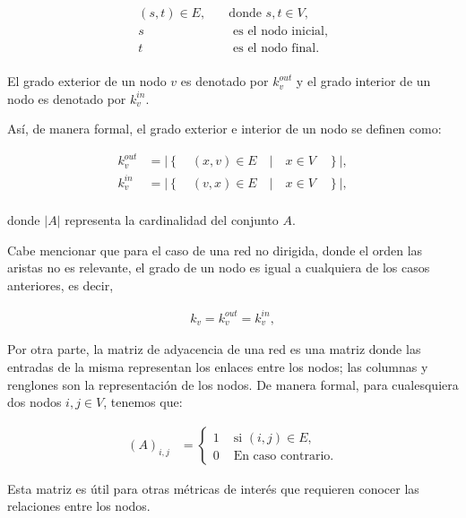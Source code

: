 \documentclass[../main.tex]{subfiles}
\begin{document}

\begin{align*}
    (s,t) \in E, &\quad \text{donde } s,t \in V, \\
    s &\quad \text{ es el nodo inicial,} \\
    t &\quad \text{ es el nodo final.} \\
\end{align*}

El grado exterior de un nodo $v$ es denotado por $k^{out}_v$ y el grado interior de un nodo es denotado por $k^{in}_v$.  

Así, de manera formal, el grado exterior e interior de un nodo se definen como:  

\begin{align*}
k^{out}_v &= \left|\left\{ \quad (x,v) \in E \quad | \quad x \in V \quad  \right\}\right|,  \\
k^{in}_v &= \left|\left\{ \quad (v,x) \in E \quad | \quad x \in V \quad  \right\}\right|,  \\
\end{align*}

donde $|A|$ representa la cardinalidad del conjunto $A$. 

Cabe mencionar que para el caso de una red no dirigida, donde el orden las aristas no es relevante, el grado de un nodo es igual a cualquiera de los casos anteriores, es decir, 


\begin{align*}
    k_v = k^{out}_v =  k^{in}_v ,
\end{align*}


Por otra parte, la matriz de adyacencia de una red es una matriz donde las entradas de la misma representan los enlaces entre los nodos; las columnas y renglones son la representación de los nodos. De manera formal, para cualesquiera dos nodos $i,j \in V$, tenemos que:

\begin{align*}
    (A)_{i,j} &= \begin{cases}
1 & \text{ si } (i,j) \in  E\text{,}  \\
0 & \text{ En caso contrario.}
\end{cases}
\end{align*}

Esta matriz es útil para otras métricas de interés que requieren conocer las relaciones entre los nodos. 
\end{document}
